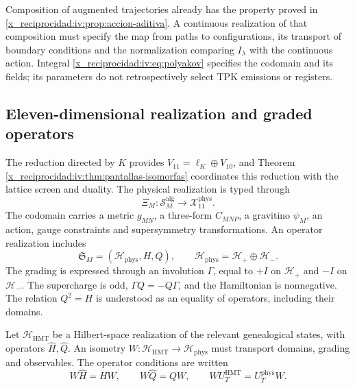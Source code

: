 Composition of augmented trajectories already has the
property proved in \ref{x_reciprocidad:iv:prop:accion-aditiva}.
A continuous realization of that composition must
specify the map from paths to configurations,
its transport of boundary conditions and the
normalization comparing \(I_\lambda\) with the continuous
action. Integral \eqref{x_reciprocidad:iv:eq:polyakov} specifies
the codomain and its fields; its parameters do not
retrospectively select TPK emissions or registers.

\subsection{Eleven-dimensional realization and graded operators}

The reduction directed by \(K\) provides
\(V_{11}=\ell_K\oplus V_{10}\), and Theorem
\ref{x_reciprocidad:iv:thm:pantallas-isomorfas} coordinates this reduction
with the lattice screen and duality. The physical
realization is typed through
\[
 \Xi_M:\mathscr S_M^{\mathrm{alg}}
                  \longrightarrow\mathcal X_{11}^{\mathrm{phys}}.
\]
The codomain carries a metric \(g_{MN}\), a three-form
\(C_{MNP}\), a gravitino \(\psi_M\), an action,
gauge constraints and supersymmetry
transformations. An operator realization includes
\[
 \mathfrak S_M=(\mathcal H_{\mathrm{phys}},H,Q),\qquad
 \mathcal H_{\mathrm{phys}}=\mathcal H_+\oplus\mathcal H_-.
\]
The grading is expressed through an involution
\(\Gamma\), equal to \(+I\) on \(\mathcal H_+\)
and \(-I\) on \(\mathcal H_-\). The supercharge
is odd, \(\Gamma Q=-Q\Gamma\), and the
Hamiltonian is nonnegative. The relation
\(Q^2=H\) is understood as an equality of operators,
including their domains.

Let \(\mathcal H_{\mathrm{HMT}}\) be a Hilbert-space realization
of the relevant genealogical states,
with operators \(\widehat H,\widehat Q\). An
isometry \(W:\mathcal H_{\mathrm{HMT}}\to
\mathcal H_{\mathrm{phys}}\) must transport
domains, grading and observables. The operator
conditions are written
\begin{equation}
 W\widehat H=HW,\qquad
 W\widehat Q=QW,\qquad
 WU_T^{\mathrm{HMT}}=U_T^{\mathrm{phys}}W.
 \label{x_reciprocidad:iv:eq:entrelazamiento-fisico}
\end{equation}

